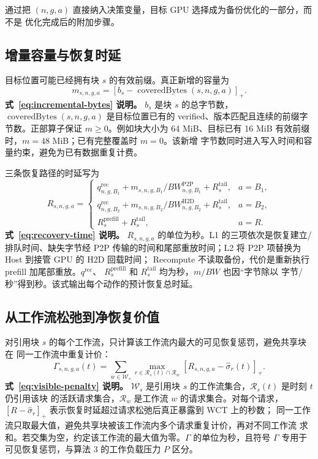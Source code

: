 \documentclass[UTF8,11pt,a4paper,fontset=fandol]{ctexart}
\newcommand{\pos}[1]{\left[#1\right]_+}
\newcommand{\BOne}{B_1}
\newcommand{\BTwo}{B_2}
\newcommand{\Recompute}{R}
\begin{document}
通过把 $(n,g,a)$ 直接纳入决策变量，目标 GPU 选择成为备份优化的一部分，而不是
优化完成后的附加步骤。

\subsection{增量容量与恢复时延}

目标位置可能已经拥有块 $s$ 的有效前缀。真正新增的容量为
\begin{equation}
  m_{s,n,g,a}
  =
  \pos{
    b_s-\operatorname{coveredBytes}(s,n,g,a)
  }.
  \label{eq:incremental-bytes}
\end{equation}
\noindent\textbf{式~\eqref{eq:incremental-bytes} 说明。}
$b_s$ 是块 $s$ 的总字节数，$\operatorname{coveredBytes}(s,n,g,a)$ 是目标位置已有的
verified、版本匹配且连续的前缀字节数。正部算子保证 $m\ge 0$。例如块大小为
64 MiB、目标已有 16 MiB 有效前缀时，$m=48$ MiB；已有完整覆盖时 $m=0$。该新增
字节数同时进入写入时间和容量约束，避免为已有数据重复计费。

三条恢复路径的时延写为
\begin{equation}
  R_{s,n,g,a}=
  \begin{cases}
    q_{n,g,\BOne}^{\mathrm{rec}}
    +m_{s,n,g,\BOne}/BW_{n,g,\BOne}^{\mathrm{P2P}}
    +R_s^{\mathrm{tail}}, & a=\BOne,\\[0.35em]
    q_{n,g,\BTwo}^{\mathrm{rec}}
    +m_{s,n,g,\BTwo}/BW_{n,g,\BTwo}^{\mathrm{H2D}}
    +R_s^{\mathrm{tail}}, & a=\BTwo,\\[0.35em]
    R_s^{\mathrm{prefill}}+R_s^{\mathrm{tail}}, & a=\Recompute.
  \end{cases}
  \label{eq:recovery-time}
\end{equation}
\noindent\textbf{式~\eqref{eq:recovery-time} 说明。}
$R_{s,n,g,a}$ 的单位为秒。L1 的三项依次是恢复建立/排队时间、缺失字节经 P2P
传输的时间和尾部重放时间；L2 将 P2P 项替换为 Host 到接管 GPU 的 H2D 回载时间；
Recompute 不读取备份，代价是重新执行 prefill 加尾部重放。$q^{\mathrm{rec}}$、
$R_s^{\mathrm{prefill}}$ 和 $R_s^{\mathrm{tail}}$ 均为秒，$m/BW$ 也因“字节除以
字节/秒”得到秒。该式输出每个动作的预计恢复总时延。

\subsection{从工作流松弛到净恢复价值}

对引用块 $s$ 的每个工作流，只计算该工作流内最大的可见恢复惩罚，避免共享块在
同一工作流中重复计价：
\begin{equation}
  \Gamma_{s,n,g,a}(t)
  =
  \sum_{w\in\mathcal W_s}
  \max_{r\in\mathcal R_s(t)\cap\mathcal R_w}
  \pos{
    R_{s,n,g,a}-\widehat{\sigma}_r(t)
  }.
  \label{eq:visible-penalty}
\end{equation}
\noindent\textbf{式~\eqref{eq:visible-penalty} 说明。}
$\mathcal W_s$ 是引用块 $s$ 的工作流集合，$\mathcal R_s(t)$ 是时刻 $t$ 仍引用该块
的活跃请求集合，$\mathcal R_w$ 是工作流 $w$ 的请求集合。对每个请求，
$\pos{R-\widehat\sigma_r}$ 表示恢复时延超过请求松弛后真正暴露到 WCT 上的秒数；
同一工作流只取最大值，避免共享块被该工作流内多个请求重复计价，再对不同工作流
求和。若交集为空，约定该工作流的最大值为零。$\Gamma$ 的单位为秒，且符号
$\Gamma$ 专用于可见恢复惩罚，与算法 3 的工作负载压力 $P$ 区分。
\end{document}
